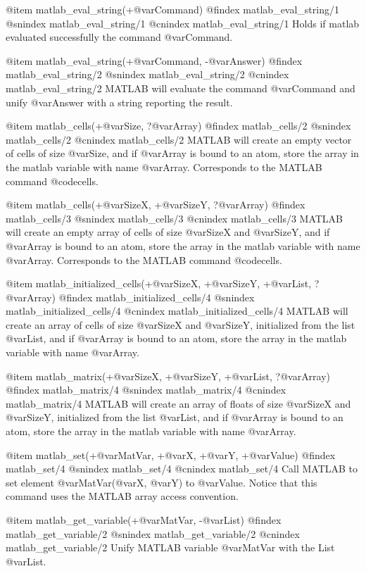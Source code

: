 {{{{{{{{{@item matlab_eval_string(+@var{Command})
@findex matlab_eval_string/1
@snindex matlab_eval_string/1
@cnindex matlab_eval_string/1
Holds if matlab evaluated successfully the command @var{Command}.

@item matlab_eval_string(+@var{Command}, -@var{Answer})
@findex matlab_eval_string/2
@snindex matlab_eval_string/2
@cnindex matlab_eval_string/2
MATLAB will evaluate the command @var{Command} and unify @var{Answer}
with a string reporting the result.


@item matlab_cells(+@var{Size}, ?@var{Array})
@findex matlab_cells/2
@snindex matlab_cells/2
@cnindex matlab_cells/2
MATLAB will create an empty vector of cells of size @var{Size}, and if
@var{Array} is bound to an atom, store the array in the matlab
variable with name @var{Array}. Corresponds to the MATLAB command @code{cells}.


@item matlab_cells(+@var{SizeX}, +@var{SizeY}, ?@var{Array})
@findex matlab_cells/3
@snindex matlab_cells/3
@cnindex matlab_cells/3
MATLAB will create an empty array of cells of size @var{SizeX} and
@var{SizeY}, and if @var{Array} is bound to an atom, store the array
in the matlab variable with name @var{Array}.  Corresponds to the
MATLAB command @code{cells}.

@item matlab_initialized_cells(+@var{SizeX}, +@var{SizeY}, +@var{List}, ?@var{Array})
@findex matlab_initialized_cells/4
@snindex matlab_initialized_cells/4
@cnindex matlab_initialized_cells/4
MATLAB will create an array of cells of size @var{SizeX} and
@var{SizeY}, initialized from the list @var{List}, and if @var{Array}
is bound to an atom, store the array in the matlab variable with name
@var{Array}.

@item matlab_matrix(+@var{SizeX}, +@var{SizeY}, +@var{List}, ?@var{Array})
@findex matlab_matrix/4
@snindex matlab_matrix/4
@cnindex matlab_matrix/4
MATLAB will create an array of floats of size @var{SizeX} and @var{SizeY},
initialized from the list @var{List}, and if @var{Array} is bound to
an atom, store the array in the matlab variable with name @var{Array}.

@item matlab_set(+@var{MatVar}, +@var{X}, +@var{Y}, +@var{Value})
@findex matlab_set/4
@snindex matlab_set/4
@cnindex matlab_set/4
Call MATLAB to set element @var{MatVar}(@var{X}, @var{Y}) to
@var{Value}. Notice that this command uses the MATLAB array access
convention.

@item matlab_get_variable(+@var{MatVar}, -@var{List})
@findex matlab_get_variable/2
@snindex matlab_get_variable/2
@cnindex matlab_get_variable/2
Unify MATLAB variable @var{MatVar} with the List @var{List}.

}}}}}}}}}

